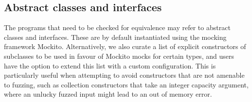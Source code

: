 \documentclass[sigconf]{acmart}
\begin{document}

\subsection{Abstract classes and interfaces}\label{sec:abstract}

The programs that need to be checked for equivalence may refer to
abstract classes and interfaces. These are by default instantiated
using the mocking framework Mockito.
%
Alternatively, we also curate a
list of explicit constructors
of subclasses to be used in favour of Mockito mocks for certain types, and users
have the option to extend this list with a custom configuration.
%
This is particularly useful when attempting to avoid constructors that are not amenable to fuzzing, such as
collection constructors that take an integer capacity argument, where an
unlucky fuzzed input might lead to an out of memory error.




\end{document}
